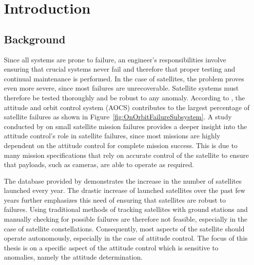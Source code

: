 %
%


\chapter{Introduction}
\label{chap:Introduction}
\section{Background}
Since all systems are prone to failure, an engineer's responsibilities involve ensuring that crucial systems never fail and therefore that proper testing and continual maintenance is performed. In the case of satellites, the problem proves even more severe, since most failures are unrecoverable. Satellite systems must therefore be tested thoroughly and be robust to any anomaly. According to \cite{tafazoli2009study}, the attitude and orbit control system (AOCS) contributes to the largest percentage of satellite failures as shown in Figure~\ref{fig:OnOrbitFailureSubsystem}. A study conducted by \cite{Jacklin2019} on small satellite mission failures provides a deeper insight into the attitude control's role in satellite failures, since most missions are highly dependent on the attitude control for complete mission success. This is due to many mission specifications that rely on accurate control of the satellite to ensure that payloads, such as cameras, are able to operate as required.



The database provided by \cite{swartwout2015cubesat} demonstrates the increase in the number of satellites launched every year. The drastic increase of launched satellites over the past few years further emphasizes this need of ensuring that satellites are robust to failures. Using traditional methods of tracking satellites with ground stations and manually checking for possible failures are therefore not feasible, especially in the case of satellite constellations. Consequently, most aspects of the satellite should operate autonomously, especially in the case of attitude control. The focus of this thesis is on a specific aspect of the attitude control which is sensitive to anomalies, namely the attitude determination. 

